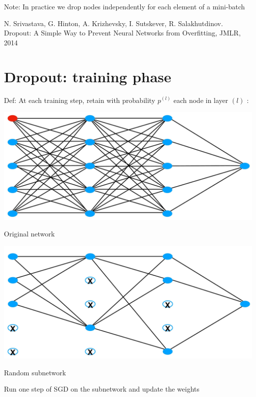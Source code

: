 \documentclass[10pt]{article}
\begin{document}
Note: In practice we drop nodes independently for each element of a mini-batch

N. Srivastava, G. Hinton, A. Krizhevsky, I. Sutskever, R. Salakhutdinov. Dropout: A Simple Way to Prevent Neural Networks from Overfitting, JMLR, 2014

\section*{Dropout: training phase}
Def: At each training step, retain with probability $p^{(l)}$ each node in layer $(l)$ :

\begin{center}
\includegraphics[max width=\textwidth]{2024_01_08_959e2db67a31f073f6d2g-30(1)}
\end{center}

Original network

\begin{center}
\includegraphics[max width=\textwidth]{2024_01_08_959e2db67a31f073f6d2g-30}
\end{center}

Random subnetwork

Run one step of SGD on the subnetwork and update the weights
\end{document}
